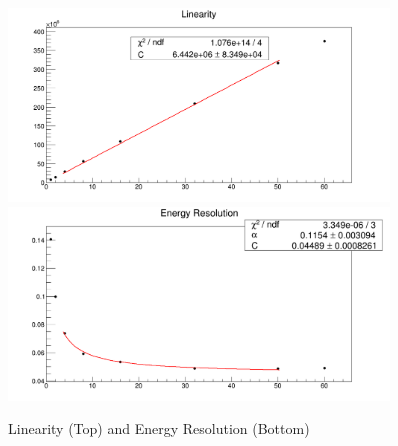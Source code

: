  \begin{figure}[hbp]
    \centering
    \includegraphics[width=0.9\textwidth]{figures/ch_simulations/hgc/performance/W/Linearity.png}
    \includegraphics[width=0.9\textwidth]{figures/ch_simulations/hgc/performance/W/Resolution.png}
    \caption{Linearity (Top) and Energy Resolution (Bottom)}
    \label{fig:simulations_hgc_wlinearityresolution}
 \end{figure}
